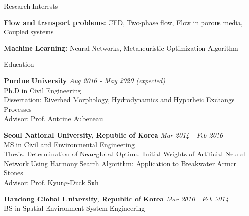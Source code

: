 \documentclass{resume_anzy.cls} %
\begin{document}
\vspace{5mm}
\begin{rSection}{Research Interests}
\begin{rSubsection}{}{}{}{}
\vspace{-2.5mm}
\item {\bf Flow and transport problems:} CFD, Two-phase flow, Flow in porous media, Coupled systems
\item {\bf Machine Learning:} Neural Networks, Metaheuristic Optimization Algorithm
\end{rSubsection}
\end{rSection}


\begin{rSection}{Education}

{\bf Purdue University} \hfill {\em Aug 2016 - May 2020 (expected)} \\ 
Ph.D in Civil Engineering  \\
Dissertation: Riverbed Morphology, Hydrodynamics and Hyporheic Exchange Processes \\
Advisor: Prof. Antoine Aubeneau

{\bf Seoul National University, Republic of Korea} \hfill {\em Mar 2014 - Feb 2016} \\ 
MS in Civil and Environmental Engineering   \\
Thesis: Determination of Near-global Optimal Initial Weights of Artificial Neural Network Using Harmony Search Algorithm: Application to Breakwater Armor Stones \\
Advisor: Prof. Kyung-Duck Suh 

{\bf Handong Global University, Republic of Korea } \hfill {\em Mar 2010 - Feb 2014} \\ 
BS in Spatial Environment System Engineering  
\vspace{2mm}
\end{rSection}

\end{document}

